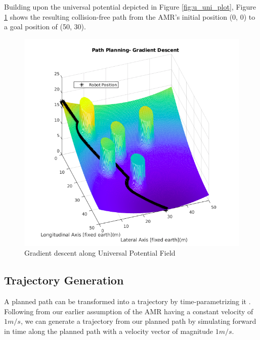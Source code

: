 \documentclass[a4paper, twocolumn]{article}
\begin{document}
Building upon the universal potential depicted in Figure \ref{fig:u_uni_plot}, 
Figure \ref{fig:path} shows the resulting collision-free path from the AMR's initial position (0, 0) to a goal position of (50, 30).

\begin{figure}
    \centering
    \includegraphics[scale=1.2]{presentation/img/path.png}
    \caption{Gradient descent along Universal Potential Field}
    \label{fig:path}
\end{figure}


\subsection{Trajectory Generation}

A planned path can be transformed into a trajectory by time-parametrizing it \cite{roesmann1}. 
Following from our earlier assumption of the AMR having a constant velocity of $1m/s$, 
we can generate a trajectory from our planned path by simulating forward in time along the planned path with a velocity 
vector of magnitude $1m/s$.
\end{document}
